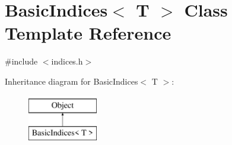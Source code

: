\hypertarget{classBasicIndices}{}\section{Basic\+Indices$<$ T $>$ Class Template Reference}
\label{classBasicIndices}


{\ttfamily \#include $<$indices.\+h$>$}

Inheritance diagram for Basic\+Indices$<$ T $>$\+:\begin{figure}[H]
\begin{center}
\leavevmode
\includegraphics[height=2.000000cm]{classBasicIndices}
\end{center}
\end{figure}
